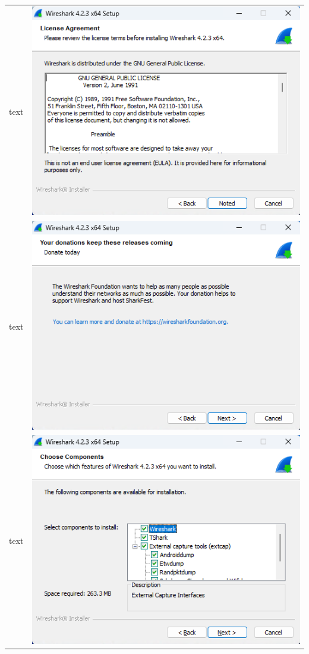 \documentclass[11pt,a4paper]{report}
\begin{document}
\begin{tabular}{ l r }
            text & \includegraphics[scale=1.0]{wireshark03} \\
            text & \includegraphics[scale=1.0]{wireshark04} \\
            text & \includegraphics[scale=1.0]{wireshark05} \\

\end{tabular}
\end{document}
